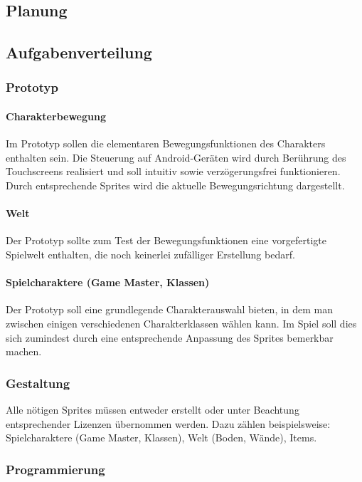 \documentclass[10pt,a4paper,notitlepage]{report}
\begin{document}
\begin{flushleft}
\chapter{Planung}
\section{Aufgabenverteilung}
\subsection{Prototyp}

\subsubsection{Charakterbewegung}
Im Prototyp sollen die elementaren Bewegungsfunktionen des Charakters enthalten sein. Die Steuerung auf Android-Geräten wird durch Berührung des Touchscreens realisiert und soll intuitiv sowie verzögerungsfrei funktionieren. Durch entsprechende Sprites wird die aktuelle Bewegungsrichtung dargestellt.

\subsubsection{Welt}
Der Prototyp sollte zum Test der Bewegungsfunktionen eine vorgefertigte Spielwelt enthalten, die noch keinerlei zufälliger Erstellung bedarf.

\subsubsection{Spielcharaktere (Game Master, Klassen)}
Der Prototyp soll eine grundlegende Charakterauswahl bieten, in dem man zwischen einigen verschiedenen Charakterklassen wählen kann. Im Spiel soll dies sich zumindest durch eine entsprechende Anpassung des Sprites bemerkbar machen.

\subsection{Gestaltung}
Alle nötigen Sprites müssen entweder erstellt oder unter Beachtung entsprechender Lizenzen übernommen werden. Dazu zählen beispielsweise: Spielcharaktere (Game Master, Klassen), Welt (Boden, Wände), Items.

\subsection{Programmierung}


\end{flushleft}
\end{document}
